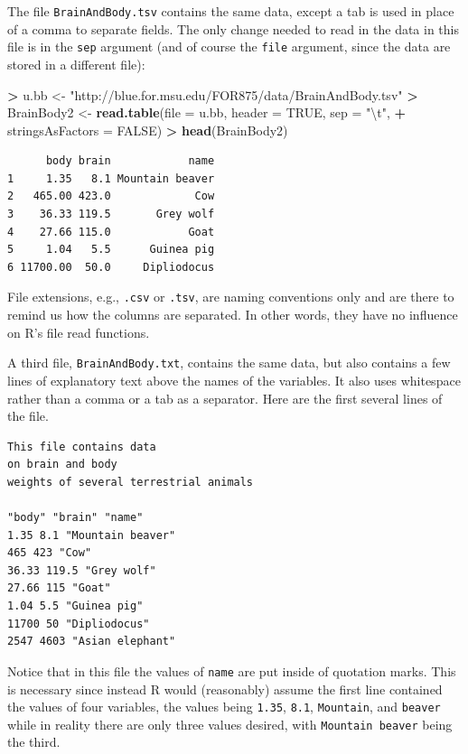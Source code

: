 \documentclass[]{krantz}
\makeatletter
\newenvironment{Shaded}{\begin{snugshade}}{\end{snugshade}}
\newcommand{\KeywordTok}[1]{\textcolor[rgb]{0.27,0.27,0.27}{\textbf{#1}}}
\newcommand{\DataTypeTok}[1]{\textcolor[rgb]{0.27,0.27,0.27}{#1}}
\newcommand{\CharTok}[1]{\textcolor[rgb]{0.5,0.5,0.5}{#1}}
\newcommand{\StringTok}[1]{\textcolor[rgb]{0.5,0.5,0.5}{#1}}
\newcommand{\OtherTok}[1]{\textcolor[rgb]{0.37,0.37,0.37}{#1}}
\newcommand{\OperatorTok}[1]{\textcolor[rgb]{0.43,0.43,0.43}{\textbf{#1}}}
\newcommand{\NormalTok}[1]{#1}
\newenvironment{kframe}{%
\medskip{}
\setlength{\fboxsep}{.8em}
 \def\at@end@of@kframe{}%
 \ifinner\ifhmode%
  \def\at@end@of@kframe{\end{minipage}}%
  \begin{minipage}{\columnwidth}%
 \fi\fi%
 \def\FrameCommand##1{\hskip\@totalleftmargin \hskip-\fboxsep
 \colorbox{shadecolor}{##1}\hskip-\fboxsep
     \hskip-\linewidth \hskip-\@totalleftmargin \hskip\columnwidth}%
 \MakeFramed {\advance\hsize-\width
   \@totalleftmargin\z@ \linewidth\hsize
   \@setminipage}}%
 {\par\unskip\endMakeFramed%
 \at@end@of@kframe}
\renewenvironment{Shaded}{\begin{kframe}}{\end{kframe}}
\makeatother
\begin{document}
The file \texttt{BrainAndBody.tsv} contains the same data, except a tab
is used in place of a comma to separate fields. The only change needed
to read in the data in this file is in the \texttt{sep} argument (and of
course the \texttt{file} argument, since the data are stored in a
different file):

\begin{Shaded}
\begin{Highlighting}[]
\OperatorTok{>}\StringTok{ }\NormalTok{u.bb <-}\StringTok{ "http://blue.for.msu.edu/FOR875/data/BrainAndBody.tsv"}
\OperatorTok{>}\StringTok{ }\NormalTok{BrainBody2 <-}\StringTok{ }\KeywordTok{read.table}\NormalTok{(}\DataTypeTok{file =}\NormalTok{ u.bb, }\DataTypeTok{header =} \OtherTok{TRUE}\NormalTok{, }\DataTypeTok{sep =} \StringTok{"}\CharTok{\textbackslash{}t}\StringTok{"}\NormalTok{, }
\OperatorTok{+}\StringTok{                          }\DataTypeTok{stringsAsFactors =} \OtherTok{FALSE}\NormalTok{)}
\OperatorTok{>}\StringTok{ }\KeywordTok{head}\NormalTok{(BrainBody2)}
\end{Highlighting}
\end{Shaded}

\begin{verbatim}
      body brain            name
1     1.35   8.1 Mountain beaver
2   465.00 423.0             Cow
3    36.33 119.5       Grey wolf
4    27.66 115.0            Goat
5     1.04   5.5      Guinea pig
6 11700.00  50.0     Dipliodocus
\end{verbatim}

File extensions, e.g., \texttt{.csv} or \texttt{.tsv}, are naming
conventions only and are there to remind us how the columns are
separated. In other words, they have no influence on R's file read
functions.

A third file, \texttt{BrainAndBody.txt}, contains the same data, but
also contains a few lines of explanatory text above the names of the
variables. It also uses whitespace rather than a comma or a tab as a
separator. Here are the first several lines of the file.

\begin{verbatim}
This file contains data
on brain and body
weights of several terrestrial animals

"body" "brain" "name"
1.35 8.1 "Mountain beaver"
465 423 "Cow"
36.33 119.5 "Grey wolf"
27.66 115 "Goat"
1.04 5.5 "Guinea pig"
11700 50 "Dipliodocus"
2547 4603 "Asian elephant"
\end{verbatim}

Notice that in this file the values of \texttt{name} are put inside of
quotation marks. This is necessary since instead R would (reasonably)
assume the first line contained the values of four variables, the values
being \texttt{1.35}, \texttt{8.1}, \texttt{Mountain}, and
\texttt{beaver} while in reality there are only three values desired,
with \texttt{Mountain\ beaver} being the third.
\end{document}
